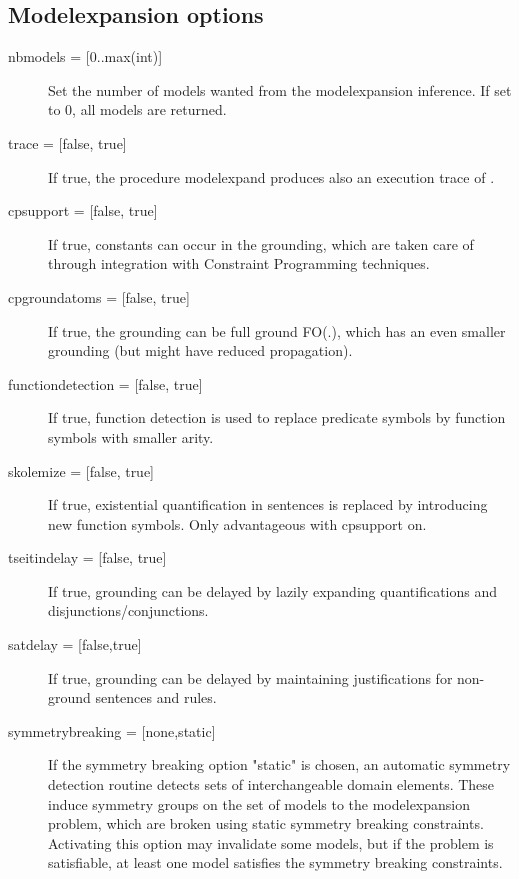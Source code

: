 \subsection{Modelexpansion options}
\begin{description}
	\item[{nbmodels = [0..max(int)]}] Set the number of models wanted from the modelexpansion inference.  If set to 0, all models are returned.
	\item[{trace = [false, true]}] If true, the procedure modelexpand produces also an execution trace of \minisatid.
	\item[{cpsupport = [false, true]}] If true, constants can occur in the grounding, which are taken care of through integration with Constraint Programming techniques. 
	\item[{cpgroundatoms = [false, true]}] If true, the grounding can be full ground FO(.), which has an even smaller grounding (but might have reduced propagation).
	\item[{functiondetection = [false, true]}] If true, function detection is used to replace predicate symbols by function symbols with smaller arity.
	\item[{skolemize = [false, true]}] If true, existential quantification in sentences is replaced by introducing new function symbols. Only advantageous with cpsupport on.
	\item[{tseitindelay = [false, true]}] If true, grounding can be delayed by lazily expanding quantifications and disjunctions/conjunctions.
	\item[{satdelay = [false,true]}] If true, grounding can be delayed by maintaining justifications for non-ground sentences and rules.
		\item[{symmetrybreaking = [none,static]}] If the symmetry breaking option "static" is chosen, an automatic symmetry detection routine detects sets of interchangeable domain elements. These induce symmetry groups on the set of models to the modelexpansion problem, which are broken using static symmetry breaking constraints. Activating this option may invalidate some models, but if the problem is satisfiable, at least one model satisfies the symmetry breaking constraints.
\end{description}

